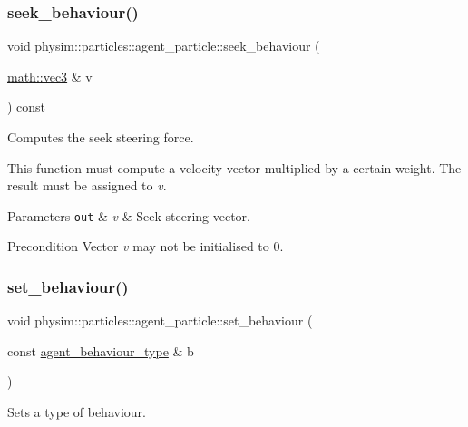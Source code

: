 \subsubsection{\texorpdfstring{seek\+\_\+behaviour()}{seek\_behaviour()}}
{\footnotesize\ttfamily void physim\+::particles\+::agent\+\_\+particle\+::seek\+\_\+behaviour (\begin{DoxyParamCaption}\item[{\hyperlink{structphysim_1_1math_1_1vec3}{math\+::vec3} \&}]{v }\end{DoxyParamCaption}) const\hspace{0.3cm}{\ttfamily [virtual]}}



Computes the seek steering force. 

This function must compute a velocity vector multiplied by a certain weight. The result must be assigned to {\itshape v}.


\begin{DoxyParams}[1]{Parameters}
\mbox{\tt out}  & {\em v} & Seek steering vector. \\
\hline
\end{DoxyParams}
\begin{DoxyPrecond}{Precondition}
Vector {\itshape v} may not be initialised to 0. 
\end{DoxyPrecond}
\mbox{\label{classphysim_1_1particles_1_1agent__particle_a5eeac79c256570806270b4de1907396f}} 
\subsubsection{\texorpdfstring{set\+\_\+behaviour()}{set\_behaviour()}}
{\footnotesize\ttfamily void physim\+::particles\+::agent\+\_\+particle\+::set\+\_\+behaviour (\begin{DoxyParamCaption}\item[{const \hyperlink{namespacephysim_1_1particles_a033757595f7862a0fc8a389d79bf9c88}{agent\+\_\+behaviour\+\_\+type} \&}]{b }\end{DoxyParamCaption})}



Sets a type of behaviour. 

